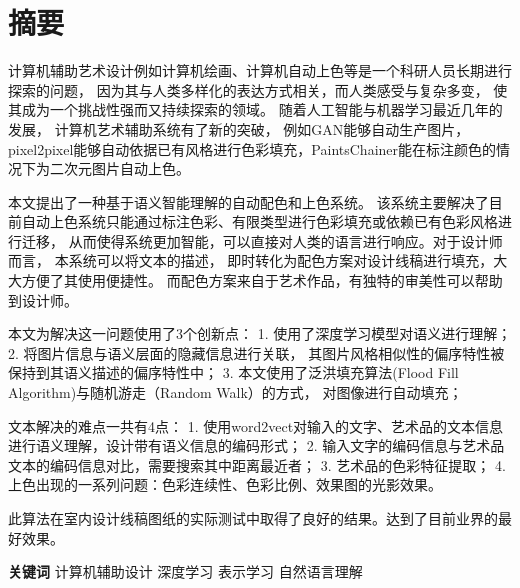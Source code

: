 \chapter{摘要}

计算机辅助艺术设计例如计算机绘画、计算机自动上色等是一个科研人员长期进行探索的问题， 因为其与人类多样化的表达方式相关，而人类感受与复杂多变， 使其成为一个挑战性强而又持续探索的领域。 随着人工智能与机器学习最近几年的发展， 计算机艺术辅助系统有了新的突破， 例如GAN能够自动生产图片， pixel2pixel能够自动依据已有风格进行色彩填充，PaintsChainer能在标注颜色的情况下为二次元图片自动上色。 

本文提出了一种基于语义智能理解的自动配色和上色系统。 该系统主要解决了目前自动上色系统只能通过标注色彩、有限类型进行色彩填充或依赖已有色彩风格进行迁移， 从而使得系统更加智能，可以直接对人类的语言进行响应。对于设计师而言， 本系统可以将文本的描述， 即时转化为配色方案对设计线稿进行填充，大大方便了其使用便捷性。 而配色方案来自于艺术作品，有独特的审美性可以帮助到设计师。

本文为解决这一问题使用了3个创新点： 1. 使用了深度学习模型对语义进行理解； 2. 将图片信息与语义层面的隐藏信息进行关联， 其图片风格相似性的偏序特性被保持到其语义描述的偏序特性中； 3. 本文使用了泛洪填充算法(Flood Fill Algorithm)与随机游走（Random Walk）的方式， 对图像进行自动填充； 

文本解决的难点一共有4点： 1. 使用word2vect对输入的文字、艺术品的文本信息进行语义理解，设计带有语义信息的编码形式； 2. 输入文字的编码信息与艺术品文本的编码信息对比，需要搜索其中距离最近者； 3. 艺术品的色彩特征提取； 4. 上色出现的一系列问题：色彩连续性、色彩比例、效果图的光影效果。

此算法在室内设计线稿图纸的实际测试中取得了良好的结果。达到了目前业界的最好效果。 


{
    \vspace{1em}
    \setlength{\parindent}{0em}
    \textbf{关键词} \; 计算机辅助设计 \; 深度学习\; 表示学习\; 自然语言理解 \par
}
